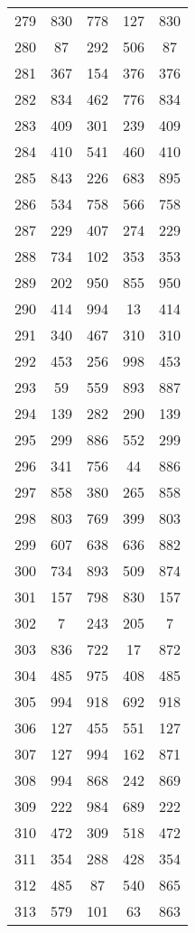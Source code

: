 \documentclass[a4paper,10pt,ngerman]{scrartcl}
\begin{document}
\begin{longtable}[c]{c|c|c|c|c}
    279 & 830 & 778 & 127 & 830 \\
    280 & 87 & 292 & 506 & 87 \\
    281 & 367 & 154 & 376 & 376 \\
    282 & 834 & 462 & 776 & 834 \\
    283 & 409 & 301 & 239 & 409 \\
    284 & 410 & 541 & 460 & 410 \\
    285 & 843 & 226 & 683 & 895 \\
    286 & 534 & 758 & 566 & 758 \\
    287 & 229 & 407 & 274 & 229 \\
    288 & 734 & 102 & 353 & 353 \\
    289 & 202 & 950 & 855 & 950 \\
    290 & 414 & 994 & 13 & 414 \\
    291 & 340 & 467 & 310 & 310 \\
    292 & 453 & 256 & 998 & 453 \\
    293 & 59 & 559 & 893 & 887 \\
    294 & 139 & 282 & 290 & 139 \\
    295 & 299 & 886 & 552 & 299 \\
    296 & 341 & 756 & 44 & 886 \\
    297 & 858 & 380 & 265 & 858 \\
    298 & 803 & 769 & 399 & 803 \\
    299 & 607 & 638 & 636 & 882 \\
    300 & 734 & 893 & 509 & 874 \\
    301 & 157 & 798 & 830 & 157 \\
    302 & 7 & 243 & 205 & 7 \\
    303 & 836 & 722 & 17 & 872 \\
    304 & 485 & 975 & 408 & 485 \\
    305 & 994 & 918 & 692 & 918 \\
    306 & 127 & 455 & 551 & 127 \\
    307 & 127 & 994 & 162 & 871 \\
    308 & 994 & 868 & 242 & 869 \\
    309 & 222 & 984 & 689 & 222 \\
    310 & 472 & 309 & 518 & 472 \\
    311 & 354 & 288 & 428 & 354 \\
    312 & 485 & 87 & 540 & 865 \\
    313 & 579 & 101 & 63 & 863 \\

\end{longtable}
\end{document}
